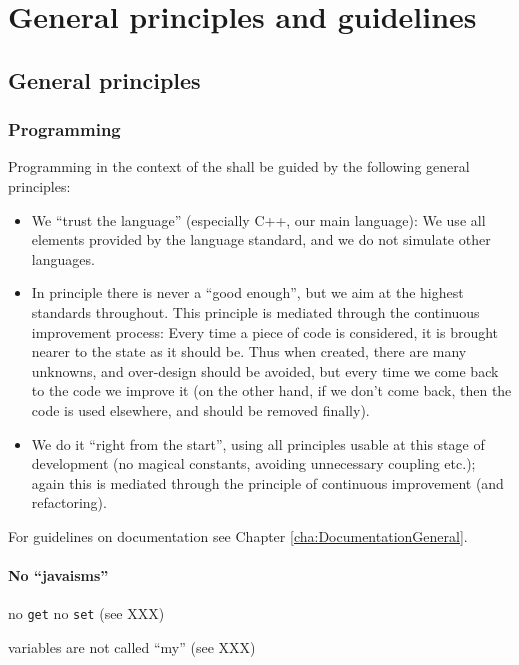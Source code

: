 \documentclass{book}
\newcommand{\name}[1]{\texttt{#1}}
\begin{document}
\part{General principles and guidelines}
\label{par:General}


\chapter{General principles}
\label{cha:GenPrinciples}


\section{Programming}
\label{sec:GenPrinciplesProgramming}

Programming in the context of the \OKlibrary{} shall be guided by the following general principles:
\begin{itemize}
\item We ``trust the language'' (especially C++, our main language): We use all elements provided by the language standard, and we do not simulate other languages.
\item In principle there is never a ``good enough'', but we aim at the highest standards throughout. This principle is mediated through the continuous improvement process: Every time a piece of code is considered, it is brought nearer to the state as it should be. Thus when created, there are many unknowns, and over-design should be avoided, but every time we come back to the code we improve it (on the other hand, if we don't come back, then the code is used elsewhere, and should be removed finally).
\item We do it ``right from the start'', using all principles usable at this stage of development (no magical constants, avoiding unnecessary coupling etc.); again this is mediated through the principle of continuous improvement (and refactoring).
\end{itemize}

For guidelines on documentation see Chapter \ref{cha:DocumentationGeneral}.

\subsection{No ``javaisms''}
\label{sec:nojavaisms}

no \name{get} no \name{set} (see XXX)

variables are not called ``my'' (see XXX)
\end{document}
